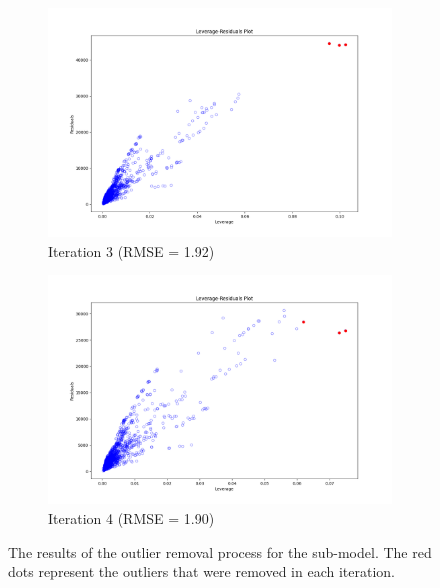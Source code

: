 \begin{figure}[]
\begin{subfigure}{.5\textwidth}
    \centering
    \includegraphics[width=0.9\linewidth]{images/FeOT_Full_3.png}
    \caption{Iteration 3 (RMSE = 1.92)}
    \label{fig:iteration3}
\end{subfigure}%
\begin{subfigure}{.5\textwidth}
    \centering
    \includegraphics[width=0.9\linewidth]{images/FeOT_Full_4.png}
    \caption{Iteration 4 (RMSE = 1.90)}
    \label{fig:iteration4}
\end{subfigure}


\caption{The results of the outlier removal process for the  sub-model. The red dots represent the outliers that were removed in each iteration.}
\label{fig:FeOT_oxide_removal}
\end{figure}


